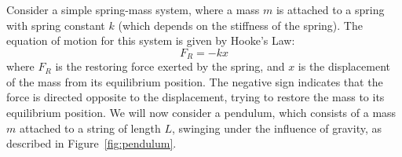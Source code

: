 Consider a simple spring-mass system, where a mass $m$ is attached to a spring with spring constant $k$ (which depends on the stiffness of the spring). The equation of motion for this system is given by Hooke's Law:
\[
    F_R = -kx
\]
where $F_R$ is the restoring force exerted by the spring, and $x$ is the displacement of the mass from its equilibrium position. The negative sign indicates that the force is directed opposite to the displacement, trying to restore the mass to its equilibrium position. We will now consider a pendulum, which consists of a mass $m$ attached to a string of length $L$, swinging under the influence of gravity, as described in Figure~\ref{fig:pendulum}.
\begin{figure}
    \centering
\end{figure}
